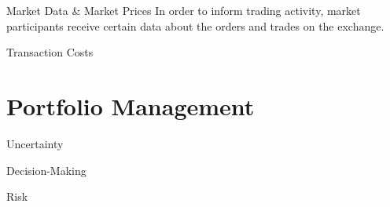 \documentclass{beamer}
\begin{document}
\begin{frame}{Market Data \& Market Prices}
	In order to inform trading activity, market participants receive certain data about the orders and trades on the exchange.




\end{frame}

\begin{frame}{Transaction Costs}



\end{frame}

\section{Portfolio Management}
\begin{frame}{Uncertainty}
\end{frame}

\begin{frame}{Decision-Making}
\end{frame}

\begin{frame}{Risk}
\end{frame}
\end{document}
